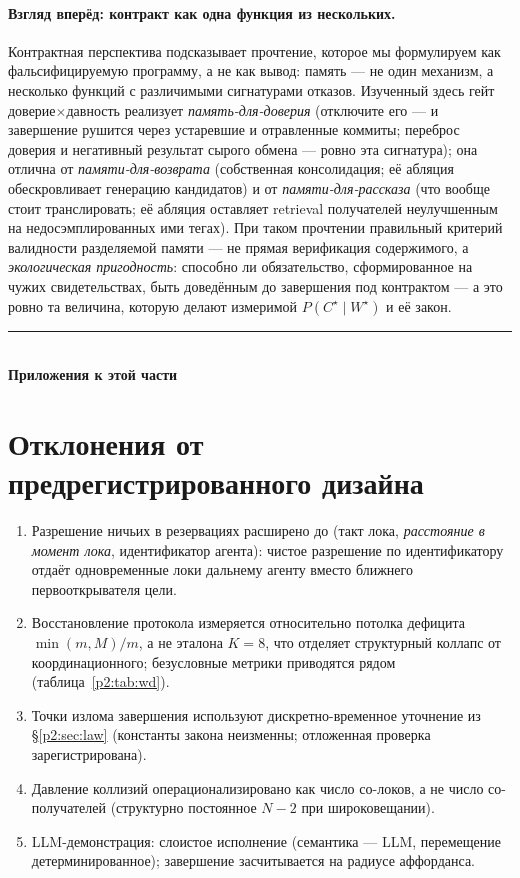 \documentclass{article}
\newcommand{\wstar}{W^{\star}}
\newcommand{\cstar}{C^{\star}}
\begin{document}
\paragraph{Взгляд вперёд: контракт как одна функция из нескольких.}
Контрактная перспектива подсказывает прочтение, которое мы формулируем
как фальсифицируемую программу, а не как вывод: память --- не один
механизм, а несколько функций с различимыми сигнатурами отказов.
Изученный здесь гейт доверие$\times$давность реализует
\emph{память-для-доверия} (отключите его --- и завершение рушится
через устаревшие и отравленные коммиты; переброс доверия и негативный
результат сырого обмена --- ровно эта сигнатура); она отлична от
\emph{памяти-для-возврата} (собственная консолидация; её абляция
обескровливает генерацию кандидатов) и от \emph{памяти-для-рассказа}
(что вообще стоит транслировать; её абляция оставляет retrieval
получателей неулучшенным на недосэмплированных ими тегах). При таком
прочтении правильный критерий валидности разделяемой памяти --- не
прямая верификация содержимого, а \emph{экологическая пригодность}:
способно ли обязательство, сформированное на чужих свидетельствах,
быть доведённым до завершения под контрактом --- а это ровно та
величина, которую делают измеримой $P(\cstar \mid \wstar)$ и её закон.

\FloatBarrier
\begin{center}\rule{0.55\linewidth}{0.4pt}\\[2pt]\textbf{Приложения к этой части}\end{center}


\section{Отклонения от предрегистрированного дизайна}
\label{p2:app:deviations}
\begin{enumerate}[leftmargin=20pt,itemsep=2pt,topsep=2pt]
\item Разрешение ничьих в резервациях расширено до (такт лока,
  \emph{расстояние в момент лока}, идентификатор агента): чистое
  разрешение по идентификатору отдаёт одновременные локи дальнему
  агенту вместо ближнего первооткрывателя цели.
\item Восстановление протокола измеряется относительно потолка
  дефицита $\min(m,M)/m$, а не эталона $K{=}8$, что отделяет
  структурный коллапс от координационного; безусловные метрики
  приводятся рядом (таблица~\ref{p2:tab:wd}).
\item Точки излома завершения используют дискретно-временное
  уточнение из \S\ref{p2:sec:law} (константы закона неизменны;
  отложенная проверка зарегистрирована).
\item Давление коллизий операционализировано как число со-локов, а не
  число со-получателей (структурно постоянное $N{-}2$ при
  широковещании).
\item LLM-демонстрация: слоистое исполнение (семантика --- LLM,
  перемещение детерминированное); завершение засчитывается на радиусе
  аффорданса.
\end{enumerate}
\end{document}
